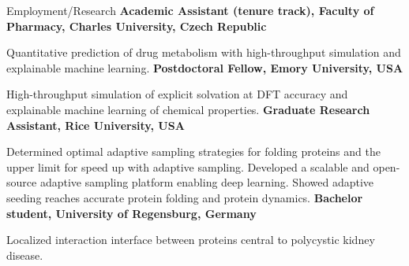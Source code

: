 \begin{rubric}{Employment/Research}
%
  \textbf{Academic Assistant (tenure track), Faculty of Pharmacy, Charles University, Czech Republic}
  \par Quantitative prediction of drug metabolism with high-throughput simulation and explainable machine learning. 
\entry*[2020 -- 2022]%
	\textbf{Postdoctoral Fellow, Emory University, USA}
  \par High-throughput simulation of explicit solvation at DFT accuracy and explainable machine learning of chemical properties. 
\entry*[2014 -- 2020]%
  \textbf{Graduate Research Assistant, Rice University, USA}
  \par Determined optimal adaptive sampling strategies for folding proteins and the upper limit for speed up with adaptive sampling. Developed a scalable and open-source adaptive sampling platform enabling deep learning. Showed adaptive seeding reaches accurate protein folding and protein dynamics.
\entry*[2012]%
  \textbf{Bachelor student, University of Regensburg, Germany}
  \par Localized interaction interface between proteins central to polycystic kidney disease.
\end{rubric}

